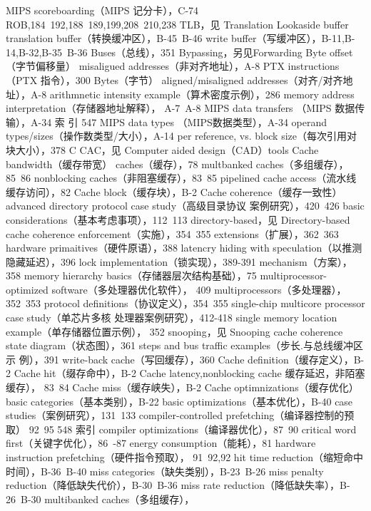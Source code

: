 MIPS scoreboarding（MIPS 记分卡），C-74
ROB,184~192,188~189,199,208~210,238
TLB，见 Translation Lookaside buffer
translation buffer（转换缓冲区），B-45~B-46
write buffer（写缓冲区），B-11,B-14,B-32,B-35~B-36
Buses（总线），351
Bypassing，另见Forwarding
Byte offset（字节偏移量）
misaligued addresses（非对齐地址），A-8
PTX instructions（PTX 指令），300
Bytes（字节）
aligned/misaligned addresses（对齐/对齐地址），A-8
arithmnetic intensity example（算术密度示例），286
memory address interpretation（存储器地址解释），
A-7~A-8
MIPS data transfers （MIPS 数据传输），A-34
索
引
547
MIPS data types （MIPS数据类型），A-34
operand types/sizes（操作数类型/大小），A-14
per reference, vs. block size（每次引用对块大小），378
C
CAC，见 Computer aided design（CAD）tools
Cache bandwidth（缓存带宽）
caches（缓存），78
multbanked caches（多组缓存），85~86
nonblocking caches（非阻塞缓存），83~85
pipelined cache access（流水线缓存访问），82
Cache block（缓存块），B-2
Cache coherence（缓存一致性）
advanced directory protocol case study（高级目录协议
案例研究），420~426
basic considerations（基本考虑事项），112~113
directory-based，见 Directory-based cache coherence
enforcement（实施），354~355
extensions（扩展），362~363
hardware primaitives（硬件原语），388
latencry hiding with speculation（以推测隐藏延迟），396
lock implementation（锁实现），389-391
mechanism（方案），358
memory hierarchy basics（存储器层次结构基础），75
multiprocessor-optimized software（多处理器优化软件），
409
multiprocessors（多处理器），352~353
protocol definitions（协议定义），354~355
single-chip multicore processor case study（单芯片多核
处理器案例研究），412-418
single memory location example（单存储器位置示例），
352
snooping，见 Snooping cache coherence
state diagram（状态图），361
steps and bus traffic examples（步长.与总线缓冲区示
例），391
write-back cache（写回缓存），360
Cache definition（缓存定义），B-2
Cache hit（缀存命中），B-2
Cache latency,nonblocking cache 缓存延迟，非陌塞缓存），
83~84
Cache miss（缓存峡失），B-2
Cache optimnizations（缓存优化）
basic categories（基本类别），B-22
basic optimizations（基本优化），B-40
case studies（案例研究），131~133
compiler-controlled prefetching（编译器控制的预取）
92~95
548
索引
compiler optimizations（编译器优化），87~90
critical word first（关键字优化），86~-87
energy consumption（能耗），81
hardware instruction prefetching（硬件指令预取），
91~92,92
hit time reduction（缩短命中时间），B-36~B-40
miss categories（缺失类别），B-23~B-26
miss penalty reduction（降低缺失代价），B-30~B-36
miss rate reduction（降低缺失率），B-26~B-30
multibanked caches（多组缓存），
